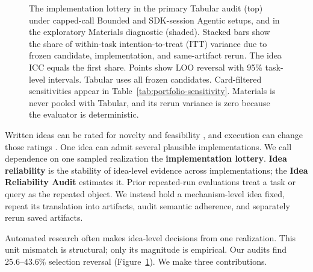 \documentclass[letterpaper]{article}
\begin{document}
\begin{figure}[t]
\caption{The implementation lottery in the primary Tabular audit (top) under capped-call Bounded and SDK-session Agentic setups, and in the exploratory Materials diagnostic (shaded). Stacked bars show the share of within-task intention-to-treat (ITT) variance due to frozen candidate, implementation, and same-artifact rerun. The idea ICC equals the first share. Points show LOO reversal with 95\% task-level intervals. Tabular uses all frozen candidates. Card-filtered sensitivities appear in Table~\ref{tab:portfolio-sensitivity}. Materials is never pooled with Tabular, and its rerun variance is zero because the evaluator is deterministic.}
\label{fig:main}
\end{figure}

Written ideas can be rated for novelty and feasibility \cite{si2025ideas}, and execution can change those ratings \cite{si2026gap}. One idea can admit several plausible implementations. We call dependence on one sampled realization the \textbf{implementation lottery}. \textbf{Idea reliability} is the stability of idea-level evidence across implementations; the \textbf{Idea Reliability Audit} estimates it. Prior repeated-run evaluations treat a task or query as the repeated object. We instead hold a mechanism-level idea fixed, repeat its translation into artifacts, audit semantic adherence, and separately rerun saved artifacts.

Automated research often makes idea-level decisions from one realization. This unit mismatch is structural; only its magnitude is empirical. Our audits find 25.6--43.6\% selection reversal (Figure~\ref{fig:main}). We make three contributions.
\end{document}

